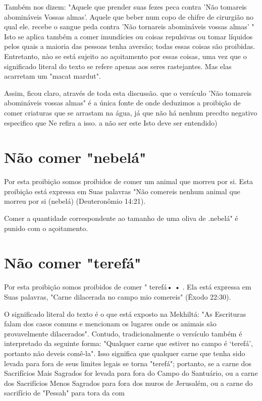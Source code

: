 \begin{itemize}
\begin{enumrate}
\begin{itemize}
\begin{itemize}
\begin{itemize}
Também nos dizem: "Aquele que prender suas fezes peca contra 'Não
tomareis abomináveis Vossas almas'. Aquele que beber num copo de chifre
de cirurgião no qual ele. recebe o sangue peda contra 'Não tornareis
abomináveis vossas almas' " Isto se aplica também a comer imundícies ou
coisas repulsivas ou tomar líquidos pelos quais a maioria das pessoas
tenha aversão; todas essas coisas são proibidas. Entretanto, nào se está
sujeito ao açoitamento por essas coisas, uma vez que o significado
literal do texto se refere apenas aos seres ras­tejantes. Mas elas
acarretam um "macat mardut".

Assim, ficou claro, através de toda esta discussão. que o versículo 'Não
tomareis abomináveis vossas almas" é a única fonte de onde deduzimos a
proibição de comer criaturas que se arrastam na água, já que não há
nenhum precdto negativo especifico que Ne refira a isso. a não ser este
Isto deve ser entendido)

\section{Não comer "nebelá"}

Por esta proibição somos proibidos de comer um animal que mor­reu por
si. Esta proibição está expressa em Suas palavras "Não comereis ne­nhum
animal que morreu por si (nebelá) (Deuteronômio 14:21).

Comer a quantidade correspondente ao tamanho de uma oliva de
.nebelá" é punido com o açoitamento.

\section{Não comer "terefá"}

Por esta proibição somos proibidos de comer " terefá• • . Ela está
ex­pressa em Suas palavras, "Carne dilacerada no campo mio comereis"
(Êxodo 22:30).

O significado literal do texto é o que está exposto na Mekhiltá: "As
Escrituras falam dos casos comuns e mencionam os lugares onde os
ani­mais são provavelmente dilacerados". Contudo, tradicionalmente o
versículo também é interpretado da seguinte forma: "Qualquer carne que
estiver no campo é `terefá', portanto não deveis comê-la". Isso
significa que qualquer carne que tenha sido levada para fora de seus
limites legais se torna "terefá"; portanto, se a carne dos Sacrifícios
Mais Sagrados for levada para fora do Cam­po do Santuário, ou a carne
dos Sacrifícios Menos Sagrados para fora dos mu­ros de Jerusalém, ou a
carne do sacrifício de "Pessah" para tora da com


\end{itemize}
\end{itemize}
\end{itemize}
\end{enumrate}
\end{itemize}
